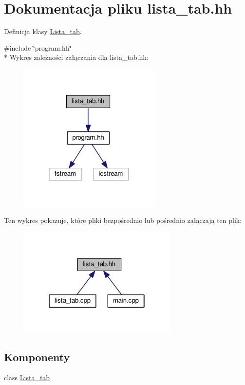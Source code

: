 \hypertarget{lista__tab_8hh}{\section{Dokumentacja pliku lista\-\_\-tab.\-hh}
\label{lista__tab_8hh}
}


Definicja klasy \hyperlink{class_lista__tab}{Lista\-\_\-tab}.  


{\ttfamily \#include \char`\"{}program.\-hh\char`\"{}}\\*
Wykres zależności załączania dla lista\-\_\-tab.\-hh\-:
\nopagebreak
\begin{figure}[H]
\begin{center}
\leavevmode
\includegraphics[width=202pt]{lista__tab_8hh__incl}
\end{center}
\end{figure}
Ten wykres pokazuje, które pliki bezpośrednio lub pośrednio załączają ten plik\-:
\nopagebreak
\begin{figure}[H]
\begin{center}
\leavevmode
\includegraphics[width=226pt]{lista__tab_8hh__dep__incl}
\end{center}
\end{figure}
\subsection*{Komponenty}
\begin{DoxyCompactItemize}
\item 
class \hyperlink{class_lista__tab}{Lista\-\_\-tab}
\end{DoxyCompactItemize}
